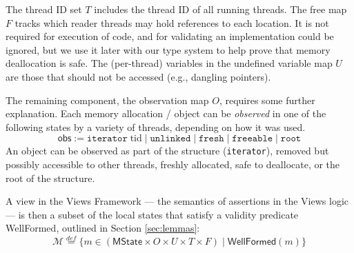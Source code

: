 The thread ID set $T$ includes the thread ID of all running threads.
The free map $F$ tracks which reader threads may hold references to each location. It is not required for execution of code, and for validating an implementation could be ignored, but we use it later with our type system to help prove that memory deallocation is safe.
The (per-thread) variables in the undefined variable map $U$ are those that should not be accessed (e.g., dangling pointers).

The remaining component, the observation map $O$, requires some further explanation.
Each memory allocation / object can be \emph{observed} in one of the following states by a variety of threads, depending on how it was used.
\[\textsf{obs} := \texttt{iterator} \; \mathrm{tid} \mid \texttt{unlinked} \mid \texttt{fresh} \mid \texttt{freeable} \mid \texttt{root}\]
An object can be observed as part of the structure (\texttt{iterator}), removed but possibly accessible to other threads, freshly allocated, safe to deallocate, or the root of the structure.


A view in the Views Framework --- the semantics of assertions in the Views logic --- is then a subset of the local states that satisfy a validity predicate \textsf{WellFormed}, outlined in Section \ref{sec:lemmas}:
\[\mathcal{M} \stackrel{def}{=} \{ m \in (\textsf{MState} \times O \times U \times T \times F) \mid  \textsf{WellFormed}(m) \} \]


